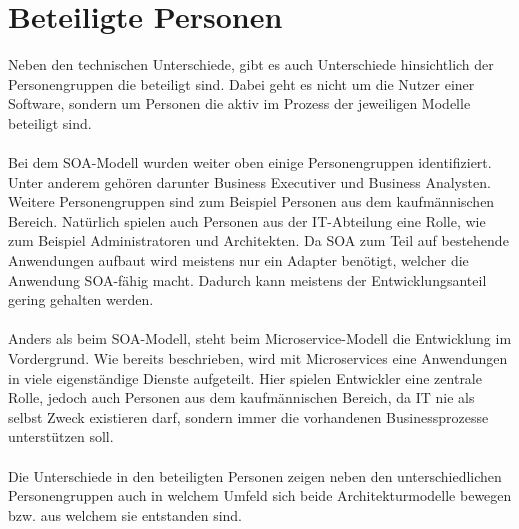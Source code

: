 \section{Beteiligte Personen}
\label{sec:FazitBeteiligtePersonen}
Neben den technischen Unterschiede, gibt es auch Unterschiede hinsichtlich der Personengruppen die beteiligt sind. Dabei geht es nicht um die Nutzer einer Software, sondern um Personen die aktiv im Prozess der jeweiligen Modelle beteiligt sind.
\\\\
Bei dem SOA-Modell wurden weiter oben einige Personengruppen identifiziert. Unter anderem gehören darunter Business Executiver und Business Analysten. Weitere Personengruppen sind zum Beispiel Personen aus dem kaufmännischen Bereich. Natürlich spielen auch Personen aus der IT-Abteilung eine Rolle, wie zum Beispiel Administratoren und Architekten. Da SOA zum Teil auf bestehende Anwendungen aufbaut wird meistens nur ein Adapter benötigt, welcher die Anwendung SOA-fähig macht. Dadurch kann meistens der Entwicklungsanteil gering gehalten werden.
\\\\
Anders als beim SOA-Modell, steht beim Microservice-Modell die Entwicklung im Vordergrund. Wie bereits beschrieben, wird mit Microservices eine Anwendungen in viele eigenständige Dienste aufgeteilt. Hier spielen Entwickler eine zentrale Rolle, jedoch auch Personen aus dem kaufmännischen Bereich, da IT nie als selbst Zweck existieren darf, sondern immer die vorhandenen Businessprozesse unterstützen soll.
\\\\
Die Unterschiede in den beteiligten Personen zeigen neben den unterschiedlichen Personengruppen auch in welchem Umfeld sich beide Architekturmodelle bewegen bzw. aus welchem sie entstanden sind.